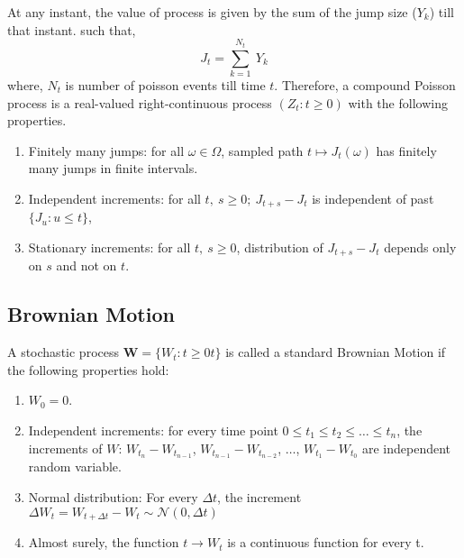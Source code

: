 \documentclass[paper.tex]{subfiles}
\begin{document}
        At any instant, the value of process is given by the sum of the jump size ($ Y_{k} $) till that instant.
        such that,
        \begin{equation}
            J_{t}=\sum_{k=1}^{N_{t}} ~ Y_{k}
            \label{eq: compound-poisson-process}
        \end{equation}
        where, $ N_{t} $ is number of poisson events till time $ t $.
        Therefore, a  compound Poisson process is a real-valued right-continuous process $\left(Z_{t}: t \geqslant 0\right)$ with the following properties.
        \begin{enumerate}
            \item Finitely many jumps: for all $\omega \in \Omega$, sampled path $t \mapsto J_{t}(\omega)$ has finitely many jumps in finite intervals.
            \item Independent increments: for all $t, ~ s \geqslant 0 ; ~ J_{t+s} - J_{t}$ is independent of past $\{J_{u}: u \leq t\}$,
            \item Stationary increments: for all $t, ~ s \geqslant 0$, distribution of $J_{t+s} - J_{t}$ depends only on $s$ and not on $t$.
        \end{enumerate}

        \subsection{Brownian Motion}
        A stochastic process $ \boldsymbol{W} = \{W_{t}: t \geqslant 0 t\} $ is called a standard Brownian Motion if the following properties hold:
        \begin{enumerate}
            \item $ W_{0} = 0 $.
            \item Independent increments: for every time point $ 0 \leqslant t_{1} \leqslant t_{2} \leqslant \hdots \leqslant t_{n} $, the increments of $ W $: $ W_{t_{n}} - W_{t_{n-1}} $, $ W_{t_{n-1}} - W_{t_{n-2}}$, $ \hdots $, $ W_{t_{1}} - W_{t_{0}} $ are independent random variable. 
            \item Normal distribution: For every $ \Delta t $, the increment $ \Delta W_{t} = W_{t + \Delta t} - W_{t} \sim \mathcal{N}(0, \Delta t)$
            \item Almost surely, the function $ t \to W_{t} $ is a continuous function for every t.
        \end{enumerate}
    
\end{document}
